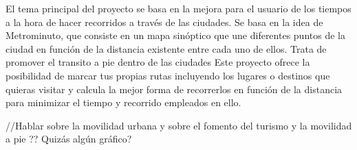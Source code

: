 
El tema principal del proyecto se basa en la mejora para el usuario de los tiempos a la hora de hacer recorridos a través de las  ciudades. Se basa en la idea de Metrominuto, que consiste en un mapa sinóptico que une diferentes puntos de la ciudad en función de la distancia existente entre cada uno de ellos. Trata de promover el transito a pie dentro de las ciudades
Este proyecto ofrece la posibilidad de marcar tus propias rutas incluyendo los lugares o destinos que quieras visitar y calcula la mejor forma de recorrerlos en función de la distancia para minimizar el tiempo y recorrido empleados en ello.

//Hablar sobre la movilidad urbana y sobre el fomento del turismo y la movilidad a pie ?? Quizás algún gráfico?



